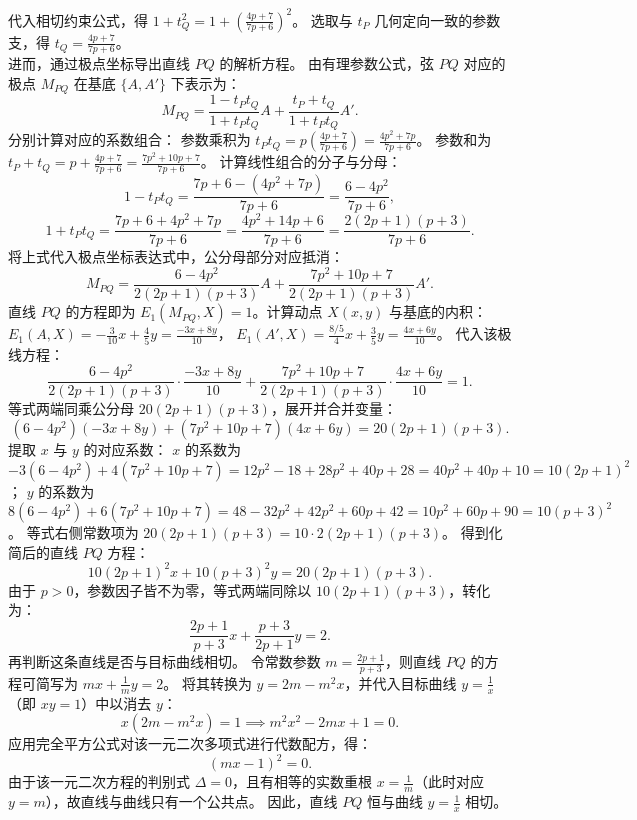 \begin{solution}
代入相切约束公式，得 $1 + t_Q^2 = 1 + \left(\frac{4p + 7}{7p + 6}\right)^2$。
选取与 $t_P$ 几何定向一致的参数支，得 $t_Q = \frac{4p + 7}{7p + 6}$。\\
进而，通过极点坐标导出直线 $PQ$ 的解析方程。
由有理参数公式，弦 $PQ$ 对应的极点 $M_{PQ}$ 在基底 $\{A, A'\}$ 下表示为：
\[ M_{PQ} = \frac{1 - t_P t_Q}{1 + t_P t_Q} A + \frac{t_P + t_Q}{1 + t_P t_Q} A'. \]
分别计算对应的系数组合：
参数乘积为 $t_P t_Q = p \left(\frac{4p + 7}{7p + 6}\right) = \frac{4p^2 + 7p}{7p + 6}$。
参数和为 $t_P + t_Q = p + \frac{4p + 7}{7p + 6} = \frac{7p^2 + 10p + 7}{7p + 6}$。
计算线性组合的分子与分母：
\[ 1 - t_P t_Q = \frac{7p + 6 - (4p^2 + 7p)}{7p + 6} = \frac{6 - 4p^2}{7p + 6}, \]
\[ 1 + t_P t_Q = \frac{7p + 6 + 4p^2 + 7p}{7p + 6} = \frac{4p^2 + 14p + 6}{7p + 6} = \frac{2(2p + 1)(p + 3)}{7p + 6}. \]
将上式代入极点坐标表达式中，公分母部分对应抵消：
\[ M_{PQ} = \frac{6 - 4p^2}{2(2p + 1)(p + 3)} A + \frac{7p^2 + 10p + 7}{2(2p + 1)(p + 3)} A'. \]
直线 $PQ$ 的方程即为 $E_1(M_{PQ}, X) = 1$。计算动点 $X(x,y)$ 与基底的内积：
$E_1(A, X) = -\frac{3}{10}x + \frac{4}{5}y = \frac{-3x + 8y}{10}$，
$E_1(A', X) = \frac{8/5}{4}x + \frac{3}{5}y = \frac{4x + 6y}{10}$。
代入该极线方程：
\[ \frac{6 - 4p^2}{2(2p + 1)(p + 3)} \cdot \frac{-3x + 8y}{10} + \frac{7p^2 + 10p + 7}{2(2p + 1)(p + 3)} \cdot \frac{4x + 6y}{10} = 1. \]
等式两端同乘公分母 $20(2p + 1)(p + 3)$，展开并合并变量：
\[ (6 - 4p^2)(-3x + 8y) + (7p^2 + 10p + 7)(4x + 6y) = 20(2p + 1)(p + 3). \]
提取 $x$ 与 $y$ 的对应系数：
$x$ 的系数为 $-3(6 - 4p^2) + 4(7p^2 + 10p + 7) = 12p^2 - 18 + 28p^2 + 40p + 28 = 40p^2 + 40p + 10 = 10(2p + 1)^2$；
$y$ 的系数为 $8(6 - 4p^2) + 6(7p^2 + 10p + 7) = 48 - 32p^2 + 42p^2 + 60p + 42 = 10p^2 + 60p + 90 = 10(p + 3)^2$。
等式右侧常数项为 $20(2p + 1)(p + 3) = 10 \cdot 2(2p + 1)(p + 3)$。
得到化简后的直线 $PQ$ 方程：
\[ 10(2p + 1)^2 x + 10(p + 3)^2 y = 20(2p + 1)(p + 3). \]
由于 $p > 0$，参数因子皆不为零，等式两端同除以 $10(2p + 1)(p + 3)$，转化为：
\[ \frac{2p + 1}{p + 3} x + \frac{p + 3}{2p + 1} y = 2. \]
再判断这条直线是否与目标曲线相切。
令常数参数 $m = \frac{2p + 1}{p + 3}$，则直线 $PQ$ 的方程可简写为 $mx + \frac{1}{m}y = 2$。
将其转换为 $y = 2m - m^2 x$，并代入目标曲线 $y = \frac{1}{x}$（即 $xy = 1$）中以消去 $y$：
\[ x (2m - m^2 x) = 1 \implies m^2 x^2 - 2mx + 1 = 0. \]
应用完全平方公式对该一元二次多项式进行代数配方，得：
\[ (mx - 1)^2 = 0. \]
由于该一元二次方程的判别式 $\Delta = 0$，且有相等的实数重根 $x = \frac{1}{m}$（此时对应 $y = m$），故直线与曲线只有一个公共点。
因此，直线 $PQ$ 恒与曲线 $y = \frac{1}{x}$ 相切。
\end{solution}



